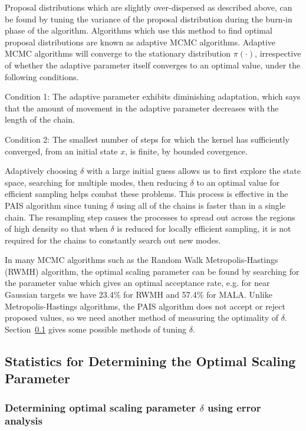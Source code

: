 \documentclass[final]{siamltex}
\begin{document}
Proposal distributions which are slightly over-dispersed as described above, can be found by tuning the variance of the proposal distribution during the burn-in phase of the algorithm. Algorithms which use this method to find optimal proposal distributions are known as adaptive MCMC algorithms. Adaptive MCMC algorithms will converge to the stationary distribution $\pi(\cdot)$, irrespective of whether the adaptive parameter itself converges to an optimal value, under the following conditions\cite{roberts2007coupling,roberts2009examples}.

Condition 1: The adaptive parameter exhibits diminishing adaptation, which says that the amount of movement in the adaptive parameter decreases with the length of the chain. 

Condition 2: The smallest number of steps for which the kernel has sufficiently converged, from an initial state $x$, is finite, by bounded covergence.

Adaptively choosing $\delta$ with a large initial guess allows us to first explore the state space, searching for multiple modes, then reducing $\delta$ to an optimal value for efficient sampling helps combat these problems. This process is effective in the PAIS algorithm since tuning $\delta$ using all of the chains is faster than in a single chain. The resampling step causes the processes to spread out across the regions of high density so that when $\delta$ is reduced for locally efficient sampling, it is not required for the chains to constantly search out new modes.

In many MCMC algorithms such as the Random Walk Metropolis-Hastings (RWMH) algorithm, the optimal scaling parameter can be found by searching for the parameter value which gives an optimal acceptance rate, e.g. for near Gaussian targets we have 23.4\% for RWMH and 57.4\% for MALA\cite{roberts2001optimal}. Unlike Metropolis-Hastings algorithms, the PAIS algorithm does not accept or reject proposed values, so we need another method of measuring the optimality of $\delta$. Section~\ref{sec:statistics} gives some possible methods of tuning $\delta$.

\subsection{Statistics for Determining the Optimal Scaling Parameter}\label{sec:statistics}

\subsubsection{Determining optimal scaling parameter $\delta$ using error analysis}
\end{document}
